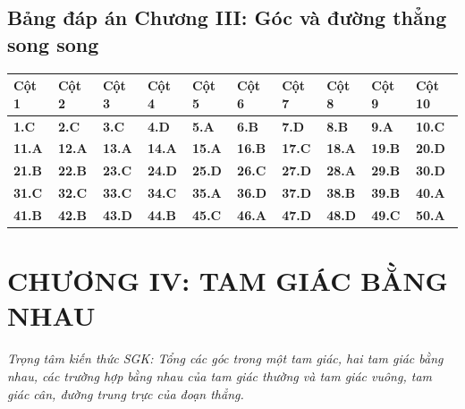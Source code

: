 \documentclass[11pt,a4paper]{article}
\begin{document}
\subsection*{\color{primary} Bảng đáp án Chương III: Góc và đường thẳng song song}
\begin{center}
\renewcommand{\arraystretch}{1.25}
\begin{tabularx}{\textwidth}{*{10}{>{\centering\arraybackslash}X}}
\toprule
\textbf{\color{primary} Cột 1} & \textbf{\color{primary} Cột 2} & \textbf{\color{primary} Cột 3} & \textbf{\color{primary} Cột 4} & \textbf{\color{primary} Cột 5} & \textbf{\color{primary} Cột 6} & \textbf{\color{primary} Cột 7} & \textbf{\color{primary} Cột 8} & \textbf{\color{primary} Cột 9} & \textbf{\color{primary} Cột 10} \\
\midrule
\textbf{1.C} & \textbf{2.C} & \textbf{3.C} & \textbf{4.D} & \textbf{5.A} & \textbf{6.B} & \textbf{7.D} & \textbf{8.B} & \textbf{9.A} & \textbf{10.C} \\
\rowcolor{rowtint} \textbf{11.A} & \textbf{12.A} & \textbf{13.A} & \textbf{14.A} & \textbf{15.A} & \textbf{16.B} & \textbf{17.C} & \textbf{18.A} & \textbf{19.B} & \textbf{20.D} \\
\textbf{21.B} & \textbf{22.B} & \textbf{23.C} & \textbf{24.D} & \textbf{25.D} & \textbf{26.C} & \textbf{27.D} & \textbf{28.A} & \textbf{29.B} & \textbf{30.D} \\
\rowcolor{rowtint} \textbf{31.C} & \textbf{32.C} & \textbf{33.C} & \textbf{34.C} & \textbf{35.A} & \textbf{36.D} & \textbf{37.D} & \textbf{38.B} & \textbf{39.B} & \textbf{40.A} \\
\textbf{41.B} & \textbf{42.B} & \textbf{43.D} & \textbf{44.B} & \textbf{45.C} & \textbf{46.A} & \textbf{47.D} & \textbf{48.D} & \textbf{49.C} & \textbf{50.A} \\
\bottomrule
\end{tabularx}
\end{center}\vspace{10pt}
\section*{\color{primary} CHƯƠNG IV: TAM GIÁC BẰNG NHAU}
\textit{Trọng tâm kiến thức SGK: Tổng các góc trong một tam giác, hai tam giác bằng nhau, các trường hợp bằng nhau của tam giác thường và tam giác vuông, tam giác cân, đường trung trực của đoạn thẳng.}\par\vspace{4pt}
\end{document}
